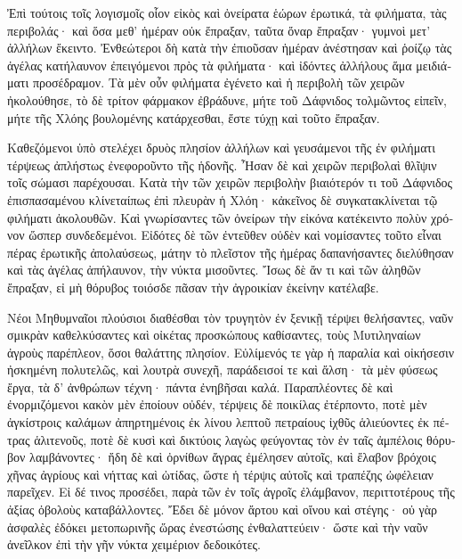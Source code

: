 \documentclass{book}
\begin{document}
\begin{pairs}
\begin{Leftside}
\begin{greek}
  Ἐπὶ τούτοις τοῖς λογισμοῖς οἷον εἰκὸς καὶ ὀνείρατα ἑώρων ἐρωτικά, τὰ φιλήματα, τὰς περιβολάς· καὶ ὅσα μεθ’ ἡμέραν οὐκ ἔπραξαν, ταῦτα ὄναρ ἔπραξαν· γυμνοὶ μετ’ ἀλλήλων ἔκειντο.  Ἐνθεώτεροι δὴ κατὰ τὴν ἐπιοῦσαν ἡμέραν ἀνέστησαν καὶ ῥοίζῳ τὰς ἀγέλας κατήλαυνον ἐπειγόμενοι πρὸς τὰ φιλήματα· καὶ ἰδόντες ἀλλήλους ἅμα μειδιάματι προσέδραμον.  Τὰ μὲν οὖν φιλήματα ἐγένετο καὶ ἡ περιβολὴ τῶν χειρῶν ἠκολούθησε, τὸ δὲ τρίτον φάρμακον ἐβράδυνε, μήτε τοῦ Δάφνιδος τολμῶντος εἰπεῖν, μήτε τῆς Χλόης βουλομένης κατάρχεσθαι, ἔστε τύχῃ καὶ τοῦτο ἔπραξαν.
\pend


  Καθεζόμενοι ὑπὸ στελέχει δρυὸς πλησίον ἀλλήλων καὶ γευσάμενοι τῆς ἐν φιλήματι τέρψεως ἀπλήστως ἐνεφοροῦντο τῆς ἡδονῆς. Ἦσαν δὲ καὶ χειρῶν περιβολαὶ θλῖψιν τοῖς σώμασι παρέχουσαι.  Κατὰ τὴν τῶν χειρῶν περιβολὴν βιαιότερόν τι τοῦ Δάφνιδος ἐπισπασαμένου κλίνεταίπως ἐπὶ πλευρὰν ἡ Χλόη· κἀκεῖνος δὲ συγκατακλίνεται τῷ φιλήματι ἀκολουθῶν. Καὶ γνωρίσαντες τῶν ὀνείρων τὴν εἰκόνα κατέκειντο πολὺν χρόνον ὥσπερ συνδεδεμένοι.  Εἰδότες δὲ τῶν ἐντεῦθεν οὐδὲν καὶ νομίσαντες τοῦτο εἶναι πέρας ἐρωτικῆς ἀπολαύσεως, μάτην τὸ πλεῖστον τῆς ἡμέρας δαπανήσαντες διελύθησαν καὶ τὰς ἀγέλας ἀπήλαυνον, τὴν νύκτα μισοῦντες. Ἴσως δὲ ἄν τι καὶ τῶν ἀληθῶν ἔπραξαν, εἰ μὴ θόρυβος τοιόσδε πᾶσαν τὴν ἀγροικίαν ἐκείνην κατέλαβε.
\pend


  Νέοι Μηθυμναῖοι πλούσιοι διαθέσθαι τὸν τρυγητὸν ἐν ξενικῇ τέρψει θελήσαντες, ναῦν σμικρὰν καθελκύσαντες καὶ οἰκέτας προσκώπους καθίσαντες, τοὺς Μυτιληναίων ἀγροὺς παρέπλεον, ὅσοι θαλάττης πλησίον.  Εὐλίμενός τε γὰρ ἡ παραλία καὶ οἰκήσεσιν ἠσκημένη πολυτελῶς, καὶ λουτρὰ συνεχῆ, παράδεισοί τε καὶ ἄλση· τὰ μὲν φύσεως ἔργα, τὰ δ’ ἀνθρώπων τέχνη·  πάντα ἐνηβῆσαι καλά. Παραπλέοντες δὲ καὶ ἐνορμιζόμενοι κακὸν μὲν ἐποίουν οὐδέν, τέρψεις δὲ ποικίλας ἐτέρποντο, ποτὲ μὲν ἀγκίστροις καλάμων ἀπηρτημένοις ἐκ λίνου λεπτοῦ πετραίους ἰχθῦς ἁλιεύοντες ἐκ πέτρας ἁλιτενοῦς, ποτὲ δὲ κυσὶ καὶ δικτύοις λαγὼς φεύγοντας τὸν ἐν ταῖς ἀμπέλοις θόρυβον λαμβάνοντες·  ἤδη δὲ καὶ ὀρνίθων ἄγρας ἐμέλησεν αὐτοῖς, καὶ ἔλαβον βρόχοις χῆνας ἀγρίους καὶ νήττας καὶ ὠτίδας, ὥστε ἡ τέρψις αὐτοῖς καὶ τραπέζης ὠφέλειαν παρεῖχεν. Εἰ δέ τινος προσέδει, παρὰ τῶν ἐν τοῖς ἀγροῖς ἐλάμβανον, περιττοτέρους τῆς ἀξίας ὀβολοὺς καταβάλλοντες.  Ἔδει δὲ μόνον ἄρτου καὶ οἴνου καὶ στέγης· οὐ γὰρ ἀσφαλὲς ἐδόκει μετοπωρινῆς ὥρας ἐνεστώσης ἐνθαλαττεύειν· ὥστε καὶ τὴν ναῦν ἀνεῖλκον ἐπὶ τὴν γῆν νύκτα χειμέριον δεδοικότες.
\pend



\end{greek}
\end{Leftside}
\end{pairs}
\end{document}
